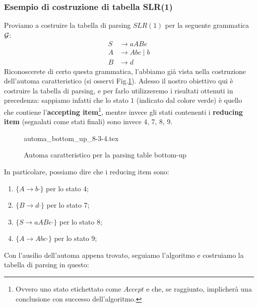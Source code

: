 \documentclass[class=book, crop=false, oneside, 12pt]{standalone}
\begin{document}
\subsubsection{Esempio di costruzione di tabella SLR(1)}
Proviamo a costruire la tabella di parsing \(SLR(1)\) per la seguente grammatica \(\mathcal{G}\):
\begin{align*}
    S &\rightarrow aABe \\
    A &\rightarrow Abc \mid b \\
    B &\rightarrow d
\end{align*}
Riconoscerete di certo questa grammatica, l'abbiamo già vista nella costruzione dell'automa caratteristico (si osservi Fig.\ref{fig:charateristic-automata-complete}). Adesso il nostro obiettivo qui è costruire la tabella di parsing, e per farlo utilizzeremo i risultati ottenuti in precedenza: sappiamo infatti che lo stato \(1\) (indicato dal colore verde) è quello che contiene l'\textbf{accepting item}\footnote{Ovvero uno stato etichettato come \(Accept\) e che, se raggiunto, implicherà una conclusione con successo dell'algoritmo.}, mentre invece gli stati contenenti i \textbf{reducing item} (segnalati come stati finali) sono invece 4, 7, 8, 9. 
\begin{figure}[H]
    \centering
	{automa_bottom_up_8-3-4.tex}
    \caption{Automa caratteristico per la parsing table bottom-up}
    \label{fig:charateristic-automata-complete}    
\end{figure}
In particolare, possiamo dire che i reducing item sono:
\begin{enumerate}
    \item \(\{A \rightarrow b \cdot\}\) per lo stato 4;
    \item \(\{B \rightarrow d \cdot\}\) per lo stato 7;
    \item \(\{S \rightarrow aABe \cdot\}\) per lo stato 8;
    \item \(\{A \rightarrow Abc \cdot\}\) per lo stato 9;
\end{enumerate}
Con l'ausilio dell'automa appena trovato, seguiamo l'algoritmo e costruiamo la tabella di parsing in questo:
\end{document}
